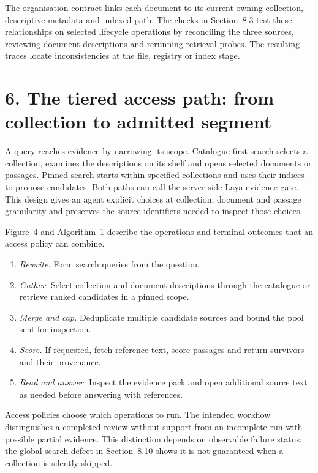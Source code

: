 The organisation contract links each document to its current owning
collection, descriptive metadata and indexed path. The checks in
Section~8.3 test these relationships on selected lifecycle
operations by reconciling the three sources, reviewing document descriptions
and rerunning retrieval probes. The resulting traces locate inconsistencies
at the file, registry or index stage.


\section{6. The tiered access path: from collection to admitted segment}



A query reaches evidence by narrowing its scope. Catalogue-first search
selects a collection, examines the descriptions on its shelf and opens
selected documents or passages. Pinned search starts within specified
collections and uses their indices to propose candidates. Both paths can
call the server-side Laya evidence gate. This design gives an agent
explicit choices at collection, document and passage granularity and
preserves the source identifiers needed to inspect those choices.

Figure~4 and Algorithm~1 describe the
operations and terminal outcomes that an access policy can combine.
\begin{enumerate}
\item \emph{Rewrite.} Form search queries from the question.
\item \emph{Gather.} Select collection and document descriptions through the
catalogue or retrieve ranked candidates in a pinned scope.
\item \emph{Merge and cap.} Deduplicate multiple candidate sources and bound the
pool sent for inspection.
\item \emph{Score.} If requested, fetch reference text, score passages and
return survivors and their provenance.
\item \emph{Read and answer.} Inspect the evidence pack and open additional
source text as needed before answering with references.
\end{enumerate}

Access policies choose which operations to run. The intended workflow distinguishes
a completed review without support from an incomplete run with possible
partial evidence. This distinction depends on observable failure status;
the global-search defect in Section~8.10 shows it is not guaranteed
when a collection is silently skipped.

